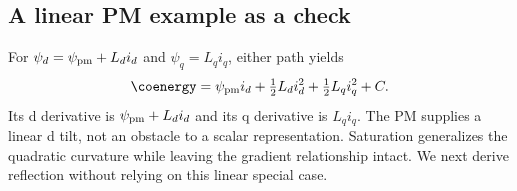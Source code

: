 \subsection{A linear PM example as a check}
For $\psi_d=\psi_{\rm pm}+L_di_d$ and $\psi_q=L_qi_q$, either path yields
\begin{equation}
 \coenergy=\psi_{\rm pm}i_d+\tfrac12L_di_d^2+\tfrac12L_qi_q^2+C.
\end{equation}
Its d derivative is $\psi_{\rm pm}+L_di_d$ and its q derivative is $L_qi_q$.
The PM supplies a linear d tilt, not an obstacle to a scalar representation.
Saturation generalizes the quadratic curvature while leaving the gradient
relationship intact. We next derive reflection without relying on this
linear special case.
